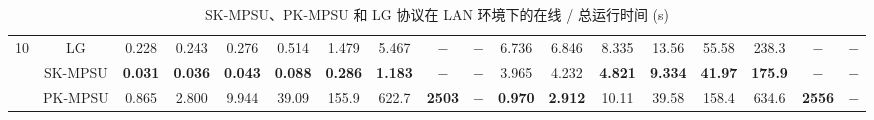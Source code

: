 \begin{table}[p]
\begin{adjustbox}{angle=90,center,scale=0.85}
\begin{tabular}{|c|c|c|c|c|c|c|c|c|c|c|c|c|c|c|c|c|c|}
\multirow{3}{*}{10} 
 & LG & \multicolumn{1}{c|}{0.228} & \multicolumn{1}{c|}{0.243} & \multicolumn{1}{c|}{0.276} & \multicolumn{1}{c|}{0.514} & \multicolumn{1}{c|}{1.479} & \multicolumn{1}{c|}{5.467} & \multicolumn{1}{c|}{$-$} & \multicolumn{1}{c|}{$-$} & \multicolumn{1}{c|}{6.736} & \multicolumn{1}{c|}{6.846} & \multicolumn{1}{c|}{8.335} & \multicolumn{1}{c|}{13.56} & \multicolumn{1}{c|}{55.58} & \multicolumn{1}{c|}{238.3} & \multicolumn{1}{c|}{$-$} & \multicolumn{1}{c|}{$-$} \\ \cline{2-18} 
 & SK-MPSU & \multicolumn{1}{c|}{\textbf{0.031}} & \multicolumn{1}{c|}{\textbf{0.036}} & \multicolumn{1}{c|}{\textbf{0.043}} & \multicolumn{1}{c|}{\textbf{0.088}} & \multicolumn{1}{c|}{\textbf{0.286}} & \multicolumn{1}{c|}{\textbf{1.183}} & \multicolumn{1}{c|}{$-$} & \multicolumn{1}{c|}{$-$} & \multicolumn{1}{c|}{3.965} & \multicolumn{1}{c|}{4.232} & \multicolumn{1}{c|}{\textbf{4.821}} & \multicolumn{1}{c|}{\textbf{9.334}} & \multicolumn{1}{c|}{\textbf{41.97}} & \multicolumn{1}{c|}{\textbf{175.9}} & \multicolumn{1}{c|}{$-$} & \multicolumn{1}{c|}{$-$} \\ \cline{2-18} 
 & PK-MPSU & \multicolumn{1}{c|}{0.865} & \multicolumn{1}{c|}{2.800} & \multicolumn{1}{c|}{9.944} & \multicolumn{1}{c|}{39.09} & \multicolumn{1}{c|}{155.9} & \multicolumn{1}{c|}{622.7} & \multicolumn{1}{c|}{\textbf{2503}} & \multicolumn{1}{c|}{$-$} & \multicolumn{1}{c|}{\textbf{0.970}} & \multicolumn{1}{c|}{\textbf{2.912}} & \multicolumn{1}{c|}{10.11} & \multicolumn{1}{c|}{39.58} & \multicolumn{1}{c|}{158.4} & \multicolumn{1}{c|}{634.6} & \multicolumn{1}{c|}{\textbf{2556}} & \multicolumn{1}{c|}{$-$} \\ \hline
\end{tabular}%
\end{adjustbox}

\vspace*{\fill}
\caption{SK-MPSU、PK-MPSU 和 LG 协议在 LAN 环境下的在线 / 总运行时间 (s)}
\label{tab:time_lan}
\end{table}

